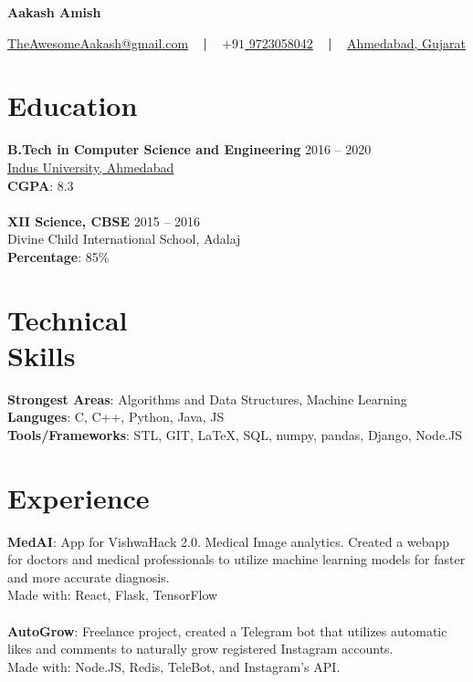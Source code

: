 \documentclass[margin, centered]{res}
\begin{document}
	\begin{center}
		\hspace{-\hoffset}
		\huge\bf{Aakash Amish}
	\end{center}
	\begin{center}
		\hspace{-\hoffset}
		\href{mailto:theawesomeaakash@gmail.com}{TheAwesomeAakash@gmail.com}
		~ \textbf{|} ~
		\href{tel:+919723058042}{\(+91\) 9723058042}
		~ \textbf{|} ~
		\href{https://goo.gl/maps/QqRrJzxewF82}{Ahmedabad, Gujarat}
	\end{center}

	\begin{resume}
		\section{Education}
			\textbf{B.Tech in Computer Science and Engineering} \hfill 2016 – 2020 \\
			\href{https://www.indusuni.ac.in/}{Indus University, Ahmedabad}\\
			\textbf{CGPA}: 8.3 \\ 
			\\
			\textbf{XII Science, CBSE} \hfill 2015 – 2016 \\
			Divine Child International School, Adalaj \\
			\textbf{Percentage}: 85\%
		
		\section{Technical \\ Skills}
			\textbf{Strongest Areas}: Algorithms and Data Structures, Machine Learning\\
			\textbf{Languges}: C, C++, Python, Java, JS\\
			\textbf{Tools/Frameworks}: STL, GIT, \LaTeX, SQL, numpy, pandas, Django, Node.JS
		
		\section{Experience}
			\textbf{MedAI}:
			App for VishwaHack 2.0. Medical Image analytics. Created a webapp for doctors and medical professionals to utilize machine learning models for faster and more accurate diagnosis.\\
			Made with: React, Flask, TensorFlow
			\\ \\
			\textbf{AutoGrow}:
			Freelance project, created a Telegram bot that utilizes automatic likes and comments to naturally grow registered Instagram accounts.\\
			Made with: Node.JS, Redis, TeleBot, and Instagram's API.
		

\end{resume}
\end{document}
